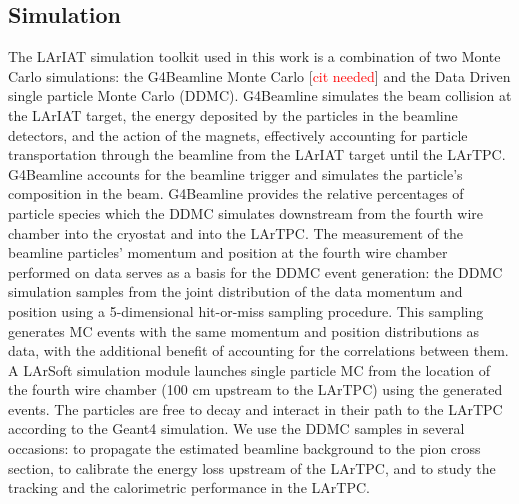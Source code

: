 \documentclass[aps,prl,twocolumn,showpacs,superscriptaddress,groupedaddress]{revtex4}  %
\begin{document}
\subsection{\label{sec:Simulation}Simulation}
The LArIAT simulation toolkit used in this work is a combination of two Monte Carlo simulations: the G4Beamline Monte Carlo  [\textcolor{red}{cit needed}] and the Data Driven single particle Monte Carlo (DDMC).  G4Beamline simulates the beam collision at the LArIAT target, the energy deposited by the particles in the beamline detectors, and the action of the magnets, effectively accounting for particle transportation through the beamline from the LArIAT target until the LArTPC. G4Beamline accounts for the beamline trigger and simulates the particle's composition in the beam. G4Beamline provides the relative percentages of particle species which the DDMC simulates downstream from the fourth wire chamber into the cryostat and into the LArTPC.  The measurement of the beamline particles' momentum and position at the fourth wire chamber performed on data serves as a basis for the DDMC event generation: the DDMC simulation samples from the joint distribution of the data momentum and position using a 5-dimensional hit-or-miss sampling procedure. This sampling generates MC events  with the same momentum and position distributions as data, with the additional benefit of accounting for the correlations between them. A LArSoft simulation module launches single particle MC from the location of the fourth wire chamber (100 cm upstream to the LArTPC) using the generated events. The particles are free to decay and interact in their path to the LArTPC according to the Geant4 simulation. We use the DDMC samples in several occasions: to propagate the estimated beamline background to the pion cross section, to calibrate the energy loss upstream of the LArTPC,  and to study the tracking and the calorimetric performance  in the LArTPC. 
\end{document}
